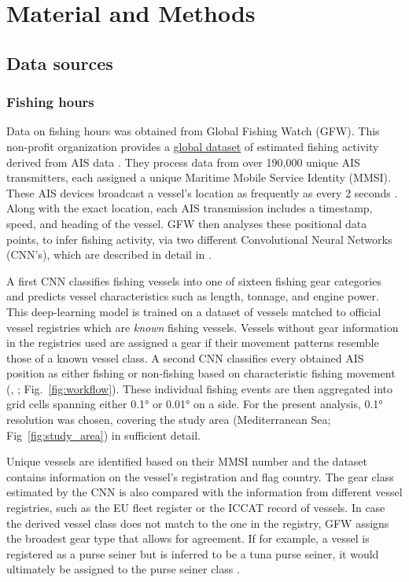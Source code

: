 \chapter{Material and Methods}

\section{Data sources}
\subsection{Fishing hours}
Data on fishing hours was obtained from Global Fishing Watch (GFW). This non-profit organization
provides a \href{https://doi.org/10.5281/zenodo.14982712}{global dataset} of estimated fishing
activity derived from AIS data \citep{gfw_dataset}. They process data from over 190,000 unique AIS
transmitters, each assigned a unique Maritime Mobile Service Identity (MMSI). These AIS devices
broadcast a vessel's location as frequently as every 2 seconds \citep{kontasvesselupdate,
	taconet2019global}. Along with the exact location, each AIS transmission includes a timestamp,
speed, and heading of the vessel. GFW then analyses these positional data points, to infer fishing
activity, via two different Convolutional Neural Networks (CNN's), which are described in detail in
\cite{Kroodsma18}.

\medskip

A first CNN classifies fishing vessels into one of sixteen fishing gear categories
 and predicts vessel characteristics such as length, tonnage, and
engine power. This deep-learning model is trained on a dataset of vessels matched to official
vessel registries which are \textit{known} fishing vessels. Vessels without gear information in the
registries used are assigned a gear if their movement patterns resemble those of a known vessel
class. A second CNN classifies every obtained AIS position as either fishing or non-fishing based
on characteristic fishing movement (\citeauthor{Kroodsma18}, \citeyear{Kroodsma18};
Fig.~\ref{fig:workflow}). These individual fishing events are then aggregated into grid cells
spanning either 0.1° or 0.01° on a side. For the present analysis, 0.1° resolution was chosen,
covering the study area (Mediterranean Sea; Fig~\ref{fig:study_area}) in sufficient detail.

\medskip

Unique vessels are identified based on their MMSI number and the dataset contains information on
the vessel's registration and flag country. The gear class estimated by the CNN is also compared
with the information from different vessel registries, such as the EU fleet register or the ICCAT
record of vessels. In case the derived vessel class does not match to the one in the registry, GFW
assigns the broadest gear type that allows for agreement. If for example, a vessel is registered as
a purse seiner but is inferred to be a tuna purse seiner, it would ultimately be assigned to the
purse seiner class .

